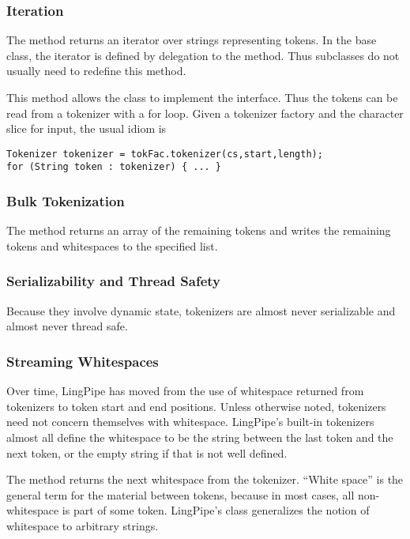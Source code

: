 \subsubsection{Iteration}

The method  returns an iterator over strings
representing tokens.  In the  base class, the iterator
is defined by delegation to the  method.  Thus
subclasses do not usually need to redefine this method.

This  method allows the  class to
implement the  interface.  Thus the tokens
can be read from a tokenizer with a for loop.  Given a tokenizer
factory  and the character slice for input, the
usual idiom is
%
\begin{verbatim}
Tokenizer tokenizer = tokFac.tokenizer(cs,start,length);
for (String token : tokenizer) { ... }
\end{verbatim}

\subsubsection{Bulk Tokenization}

The method  returns an array of the remaining tokens
and  writes the remaining tokens and
whitespaces to the specified list.

\subsubsection{Serializability and Thread Safety}

Because they involve dynamic state, tokenizers are almost never
serializable and almost never thread safe.  

 
\subsubsection{Streaming Whitespaces}

Over time, LingPipe has moved from the use of whitespace returned from
tokenizers to token start and end positions.  Unless otherwise noted,
tokenizers need not concern themselves with whitespace.  LingPipe's
built-in tokenizers almost all define the whitespace to be the 
string between the last token and the next token, or the empty string
if that is not well defined.

The method  returns the next whitespace from
the tokenizer.  ``White space'' is the general term for the material
between tokens, because in most cases, all non-whitespace is part of
some token.  LingPipe's  class generalizes the notion
of whitespace to arbitrary strings.

